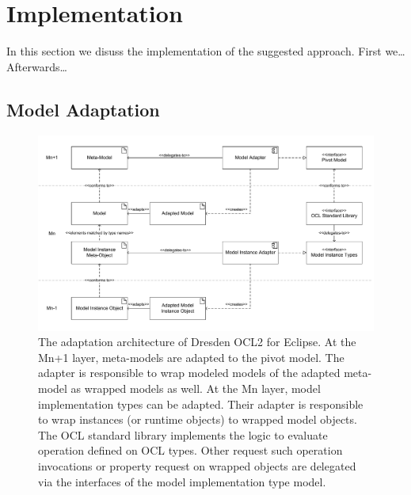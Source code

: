 \section{Implementation}

	In this section we disuss the implementation of the suggested approach.
	First we\ldots Afterwards\ldots

\subsection{Model Adaptation}

	\begin{figure}[tb]
			\centering
				\includegraphics[width=1.00\textwidth]{figures/modeladaptation.pdf}
			\caption{ The adaptation
	architecture of Dresden OCL2 for Eclipse. At the Mn+1 layer, meta-models are adapted to the pivot model. The adapter is responsible to wrap modeled models of the adapted meta-model as wrapped models as well. At the Mn layer, model implementation types can be adapted. Their adapter is responsible to wrap instances 
			(or runtime objects) to wrapped model objects. The OCL standard library implements the logic to evaluate operation 
			defined on OCL types. Other request such operation invocations or property request on wrapped objects are delegated 
			via the interfaces of the model implementation type model.}
			\label{fig:modeladaptation}
		\end{figure}

